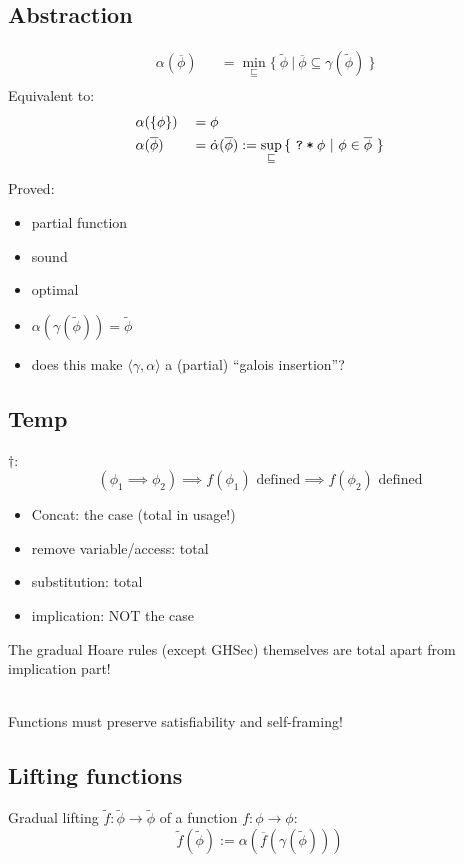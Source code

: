 \documentclass[11pt,a4paper]{article}
\newcommand{\ttt}{\texttt}
\newcommand{\grad}[1]{\widetilde{#1}}
\newcommand{\qm}{\ttt{?}}
\newcommand{\withqm}[1]{\ttt{\qm\:*\:$#1$}}
\begin{document}
\newcommand{\dalpha}{\dot{\alpha}}

\subsection{Abstraction}
\begin{align*}
&\alpha(\overline{\phi}) &&= \min_{\sqsubseteq} {\{~ \grad{\phi} ~|~ \overline{\phi} \subseteq \gamma(\grad{\phi}) ~\}}\\
\end{align*}
Equivalent to:
\begin{align*}
&\alpha(\{ \phi \}) &&= \phi\\
&\alpha(\overline{\phi}) &&= \dalpha(\overline{\phi}) := \sup_{\sqsubseteq} {\{~ \withqm{\phi} ~|~ \phi \in \overline{\phi} ~\}}\\
\end{align*}

Proved:
\begin{itemize}
	\item partial function
	\item sound
	\item optimal
	\item $\alpha(\gamma(\grad{\phi})) = \grad{\phi}$
    \item does this make $\langle \gamma, \alpha \rangle$ a (partial) “galois insertion”?
\end{itemize}

\subsection{Temp}
$\dagger$:
$$(\phi_1 \implies \phi_2) \implies f(\phi_1) \text{ defined} \implies f(\phi_2) \text{ defined}$$
\begin{itemize}
	\item Concat: the case (total in usage!)
	\item remove variable/access: total
	\item substitution: total
	\item implication: NOT the case
\end{itemize}
The gradual Hoare rules (except GHSec) themselves are total apart from implication part!

~\\
Functions must preserve satisfiability and self-framing!


\subsection{Lifting functions}
Gradual lifting $\grad{f} : \grad{\phi} \rightarrow \grad{\phi}$ of a function $f : \phi \rightarrow \phi$:
$$\grad{f}(\grad{\phi}) := \alpha(\overline{f}(\gamma(\grad{\phi})))$$ 
\end{document}
